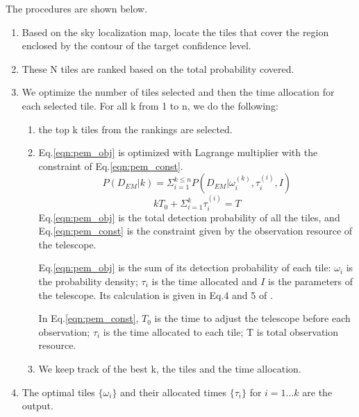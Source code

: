 \documentclass[twocolumn]{aastex61}
\begin{document}
The procedures are shown below.
\begin{enumerate}
\item Based on the sky localization map, locate the tiles that cover the region enclosed by the contour of the target confidence level.
\item These N tiles are ranked based on the total probability covered.
\item We optimize the number of tiles selected and then the time allocation for each selected tile. For all k from 1 to n, we do the following:
\begin{enumerate}
\item the top k tiles from the rankings are selected. 

\item Eq.\ref{eqn:pem_obj} is optimized with Lagrange multiplier with the constraint of Eq.\ref{eqn:pem_const}. 
\begin{equation}\label{eqn:pem_obj}
P(D_{EM}|k)=\Sigma_{i=1}^{k\leq n}P(D_{EM}|\omega_i^{(k)}, \tau_i^{(i)},I)
\end{equation}
\begin{equation}\label{eqn:pem_const}
kT_0+\Sigma_{i=1}^k\tau_i^{(i)}=T
\end{equation}
Eq.\ref{eqn:pem_obj} is the total detection probability of all the tiles, and Eq.\ref{eqn:pem_const} is the constraint given by the observation resource of the telescope. 

Eq.\ref{eqn:pem_obj} is the sum of its detection probability of each tile: $\omega_i$ is the probability density; $\tau_i$ is the time allocated and $I$ is the parameters of the telescope. Its calculation is given in Eq.4 and 5 of \cite{ChHu2017}.

In Eq.\ref{eqn:pem_const}, $T_0$ is the time to adjust the telescope before each observation; $\tau_i$ is the time allocated to each tile; T is total observation resource.
\item We keep track of the best k, the tiles and the time allocation.
\end{enumerate}

\item The optimal tiles $\{\omega_i\}$ and their allocated times $\{\tau_i\}$ for $i=1...k$ are the output.
\end{enumerate}
\end{document}
